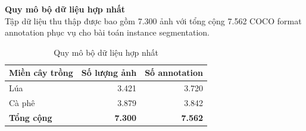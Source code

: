 \begin{frame}
    \textbf{Quy mô bộ dữ liệu hợp nhất}\\
    Tập dữ liệu thu thập được bao gồm 7.300 ảnh với tổng cộng 7.562 COCO format annotation phục vụ cho bài toán instance segmentation.

    \begin{table}[h]
        \centering
        \caption{Quy mô bộ dữ liệu hợp nhất}
        \label{tab:slide_data_overview}
        \footnotesize
        \setlength{\tabcolsep}{5pt}
        \begin{tabular}{lrr}
            \toprule
            Miền cây trồng     & Số lượng ảnh   & Số annotation  \\
            \midrule
            Lúa                & 3.421          & 3.720          \\
            Cà phê             & 3.879          & 3.842          \\
            \midrule
            \textbf{Tổng cộng} & \textbf{7.300} & \textbf{7.562} \\
            \bottomrule
        \end{tabular}
    \end{table}
\end{frame}

